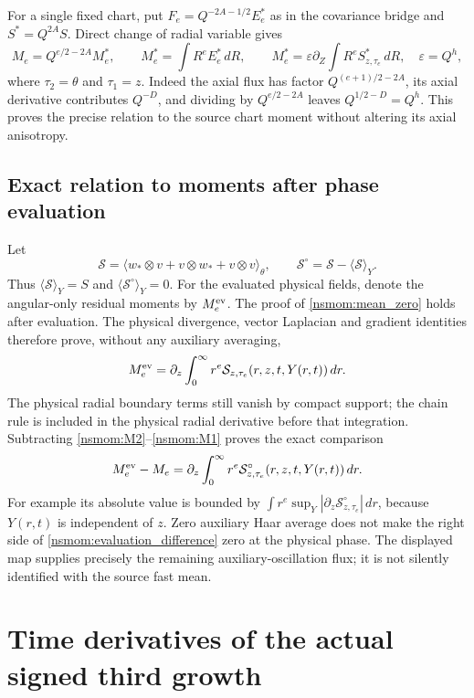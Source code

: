 \documentclass[11pt]{article}
\begin{document}
For a single fixed chart, put
$F_e=Q^{-2A-1/2}E_e^*$ as in the covariance bridge and
$S^*=Q^{2A}S$. Direct change of radial variable gives
\[
 M_e=Q^{e/2-2A}M_e^*,\qquad
 M_e^*=\int R^eE_e^*\,dR,
 \qquad
 M_e^*=\varepsilon\partial_Z\int R^e S^*_{z,\tau_e}\,dR,
 \quad\varepsilon=Q^h,
\]
where $\tau_2=\theta$ and $\tau_1=z$. Indeed the axial flux has
factor $Q^{(e+1)/2-2A}$, its axial derivative contributes $Q^{-D}$,
and dividing by $Q^{e/2-2A}$ leaves $Q^{1/2-D}=Q^h$.
This proves the precise relation to the source chart moment without
altering its axial anisotropy.

\subsection{Exact relation to moments after phase evaluation}
\label{nsmom:evaluated}
Let
\[
 \mathcal S=\langle w_*\otimes v+v\otimes w_*+v\otimes v\rangle_\theta,
 \qquad \mathcal S^\circ=\mathcal S-\langle\mathcal S\rangle_Y.
\]
Thus $\langle\mathcal S\rangle_Y=S$ and
$\langle\mathcal S^\circ\rangle_Y=0$. For the evaluated physical
fields, denote the angular-only residual moments by $M_e^{\rm ev}$.
The proof of \eqref{nsmom:mean_zero} holds after evaluation. The
physical divergence, vector Laplacian and gradient identities therefore
prove, without any auxiliary averaging,
\[
 M_e^{\rm ev}
   =\partial_z\int_0^\infty r^e
        \mathcal S_{z,\tau_e}(r,z,t,Y(r,t))\,dr.
\]
The physical radial boundary terms still vanish by compact support;
the chain rule is included in the physical radial derivative before
that integration. Subtracting \eqref{nsmom:M2}--\eqref{nsmom:M1} proves
the exact comparison
\begin{equation}
 M_e^{\rm ev}-M_e
 =\partial_z\int_0^\infty r^e
     \mathcal S^\circ_{z,\tau_e}(r,z,t,Y(r,t))\,dr.
 \label{nsmom:evaluation_difference}
\end{equation}
For example its absolute value is bounded by
$\int r^e\sup_Y|\partial_z\mathcal S^\circ_{z,\tau_e}|\,dr$,
because $Y(r,t)$ is independent of $z$. Zero auxiliary Haar average
does not make the right side of \eqref{nsmom:evaluation_difference}
zero at the physical phase. The displayed map supplies precisely the
remaining auxiliary-oscillation flux; it is not silently identified
with the source fast mean.


\section{Time derivatives of the actual signed third growth}
\label{tgdc:section}
\end{document}
